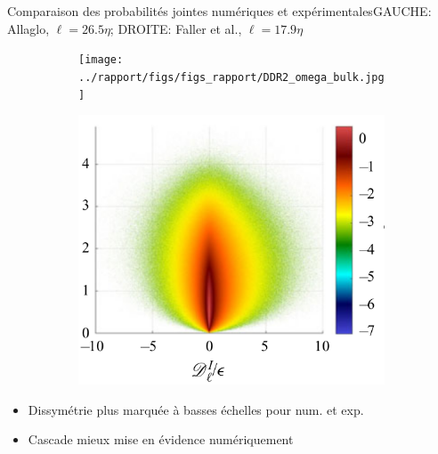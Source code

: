 \documentclass[aspectratio=169,usenames,dvipsnames]{beamer}
\begin{document}
    \begin{frame}{Comparaison des probabilités jointes numériques et expérimentales}{GAUCHE: Allaglo, $\ell=26.5\eta$; 
        DROITE: Faller et al., $\ell=17.9\eta$}
        \begin{figure}[H]
            \centering
            \begin{subfigure}[b]{0.48\linewidth}
            \centering
            \texttt{[image: ../rapport/figs/figs\_rapport/DDR2\_omega\_bulk.jpg]}
            \end{subfigure}
            \begin{subfigure}[b]{0.4\linewidth}
              \centering
              \includegraphics[width=\textwidth]{figs/faller_l2_exp.png}
              \end{subfigure}
            \label{fig:DR_penal}
          \end{figure}
          \begin{itemize}[label=]\pause
            \item Dissymétrie plus marquée à basses échelles pour num. et exp.\pause
            \item Cascade mieux mise en évidence numériquement
          \end{itemize}
        \end{frame}
\end{document}
